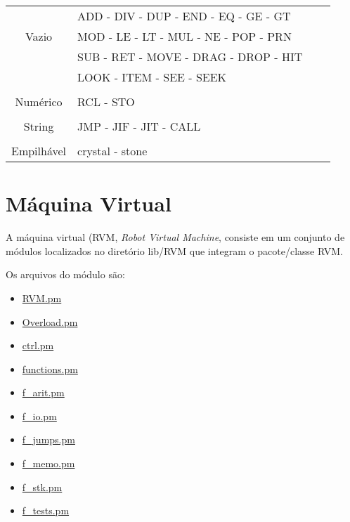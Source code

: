 \documentclass[a4paper]{article}
\begin{document}
    \begin{center}
      \begin{tabular}{|c|l|rc|}
                     &  ADD - DIV - DUP - END - EQ - GE - GT   \\
          Vazio      &  MOD - LE - LT - MUL - NE - POP - PRN   \\
                     &  SUB - RET - MOVE - DRAG - DROP - HIT   \\
                     &  LOOK - ITEM - SEE - SEEK               \\
                     &										   \\
          Numérico   &  RCL - STO                              \\
          			 &										   \\
          String     &  JMP - JIF - JIT - CALL                 \\
          			 &										   \\
          Empilhável &  crystal - stone                        \\
      \end{tabular}
    \end{center}  
    
\newpage %
 
\section{Máquina Virtual} \label{sec:maquina_virtual}
    
    A máquina virtual (RVM, \emph{Robot Virtual Machine}, consiste em 
    um conjunto de módulos localizados no diretório lib/RVM que integram 
    o pacote/classe RVM. 
    
    Os arquivos do módulo são:
    \begin{itemize}
        \item \href{run:../lib/RVM/RVM.pm}       {RVM.pm        }
        \item \href{run:../lib/RVM/Overload.pm}  {Overload.pm   }
        \item \href{run:../lib/RVM/ctrl.pm}      {ctrl.pm       }
        \item \href{run:../lib/RVM/functions.pm} {functions.pm  }
        \item \href{run:../lib/RVM/f\_arit.pm}   {f\_arit.pm    }
        \item \href{run:../lib/RVM/f\_io.pm}     {f\_io.pm      }
        \item \href{run:../lib/RVM/f\_jumps.pm}  {f\_jumps.pm   }
        \item \href{run:../lib/RVM/f\_memo.pm}   {f\_memo.pm    }
        \item \href{run:../lib/RVM/f\_stk.pm}    {f\_stk.pm     }
        \item \href{run:../lib/RVM/f\_tests.pm}  {f\_tests.pm   }
    \end{itemize}
    
\end{document}

